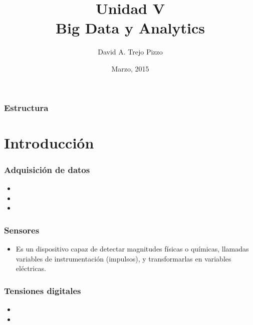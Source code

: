 \documentclass{beamer}
\title[Seminario de tecnologia]{Unidad V\\ Big Data y Analytics}
\author{David A. Trejo Pizzo}
\institute[Instituto Multimedial Da Vinci]
{Departamento de sistemas\\
\medskip
\textit{dtrejopizzo@gmail.com}}
\date{Marzo, 2015}
\begin{document}
\begin{frame}
\titlepage
\end{frame}


\begin{frame}
\frametitle{Estructura}
\tableofcontents
\end{frame}



\section{Introducción}

\begin{frame}
\frametitle{Adquisición de datos}
\begin{itemize}
\item 
\item 
\item 
\end{itemize}
\end{frame}

\begin{frame}
\frametitle{Sensores}
\begin{itemize}
\item Es un dispositivo capaz de detectar magnitudes físicas o químicas, llamadas variables de instrumentación (impulsos), y transformarlas en variables eléctricas.
\end{itemize}
\end{frame}

\begin{frame}
\frametitle{Tensiones digitales}
\begin{itemize}
\item 
\item 
\end{itemize}
\end{frame}
\end{document}

